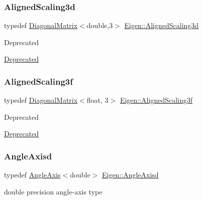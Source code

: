 \subsubsection{\texorpdfstring{AlignedScaling3d}{AlignedScaling3d}}
{\footnotesize\ttfamily typedef \mbox{\hyperlink{class_eigen_1_1_diagonal_matrix}{Diagonal\+Matrix}}$<$double,3$>$ \mbox{\hyperlink{group___geometry___module_ga0aff001d5740f13797c9acd4e3276673}{Eigen\+::\+Aligned\+Scaling3d}}}

\begin{DoxyRefDesc}{Deprecated}
\item[\mbox{\hyperlink{deprecated__deprecated000034}{Deprecated}}]\end{DoxyRefDesc}
\mbox{\label{group___geometry___module_ga45caf8b0e6da378885f4ae3f06c5cde3}} 
\subsubsection{\texorpdfstring{AlignedScaling3f}{AlignedScaling3f}}
{\footnotesize\ttfamily typedef \mbox{\hyperlink{class_eigen_1_1_diagonal_matrix}{Diagonal\+Matrix}}$<$float, 3$>$ \mbox{\hyperlink{group___geometry___module_ga45caf8b0e6da378885f4ae3f06c5cde3}{Eigen\+::\+Aligned\+Scaling3f}}}

\begin{DoxyRefDesc}{Deprecated}
\item[\mbox{\hyperlink{deprecated__deprecated000033}{Deprecated}}]\end{DoxyRefDesc}
\mbox{\label{group___geometry___module_gaed936d6e9192d97f00a9608081fa9b64}} 
\subsubsection{\texorpdfstring{AngleAxisd}{AngleAxisd}}
{\footnotesize\ttfamily typedef \mbox{\hyperlink{class_eigen_1_1_angle_axis}{Angle\+Axis}}$<$double$>$ \mbox{\hyperlink{group___geometry___module_gaed936d6e9192d97f00a9608081fa9b64}{Eigen\+::\+Angle\+Axisd}}}

double precision angle-\/axis type \mbox{\label{group___geometry___module_gad823b9c674644b14d950fbfe165dfdbf}} 
